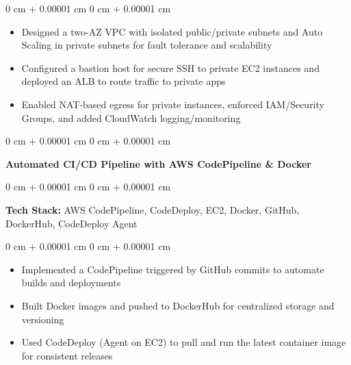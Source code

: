 \documentclass[10pt, letterpaper]{article}
\newenvironment{highlights}{
    \begin{itemize}[
        topsep=0.10 cm,
        parsep=0.10 cm,
        partopsep=0pt,
        itemsep=0pt,
        leftmargin=0 cm + 10pt
    ]
}{
    \end{itemize}
} %
\newenvironment{onecolentry}{
    \begin{adjustwidth}{
        0 cm + 0.00001 cm
    }{
        0 cm + 0.00001 cm
    }
}{
    \end{adjustwidth}
} %
\begin{document}
    \vspace{0.10 cm}

    \begin{onecolentry}
        \begin{highlights}
            \item Designed a two-AZ VPC with isolated public/private subnets and Auto Scaling in private subnets for fault tolerance and scalability
            \item Configured a bastion host for secure SSH to private EC2 instances and deployed an ALB to route traffic to private apps
            \item Enabled NAT-based egress for private instances, enforced IAM/Security Groups, and added CloudWatch logging/monitoring
        \end{highlights}
    \end{onecolentry}

    \vspace{0.2 cm}

    \begin{onecolentry}
        \textbf{Automated CI/CD Pipeline with AWS CodePipeline \& Docker}  
    \end{onecolentry}

    \vspace{0.10 cm}

    \begin{onecolentry}
        \textbf{Tech Stack:} AWS CodePipeline, CodeDeploy, EC2, Docker, GitHub, DockerHub, CodeDeploy Agent  
    \end{onecolentry}

    \vspace{0.10 cm}

    \begin{onecolentry}
        \begin{highlights}
            \item Implemented a CodePipeline triggered by GitHub commits to automate builds and deployments
            \item Built Docker images and pushed to DockerHub for centralized storage and versioning
            \item Used CodeDeploy (Agent on EC2) to pull and run the latest container image for consistent releases
        \end{highlights}
    \end{onecolentry}

    \vspace{0.2 cm}
\end{document}
